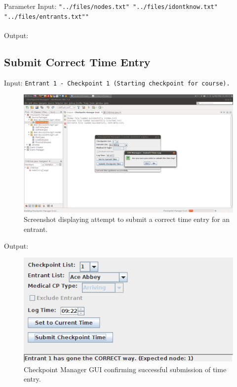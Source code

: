 \documentclass[a4paper, 10pt]{article}
\begin{document}
Parameter Input: \verb+"../files/nodes.txt" "../files/idontknow.txt" "../files/entrants.txt""+ \\\\
Output:


\subsection{Submit Correct Time Entry}

Input: \verb+Entrant 1 - Checkpoint 1 (Starting checkpoint for course).+ \\
\begin{figure}[ht!]
\centering
\includegraphics[scale=0.25]{cm-submit.png}
\caption{Screenshot displaying attempt to submit a correct time entry for an entrant.}
\end{figure}

Output:
\begin{figure}[ht!]
\centering
\includegraphics[scale=0.5]{cm-submitsuccess.png}
\caption{Checkpoint Manager GUI confirming successful submission of time entry.}
\end{figure}
\end{document}
